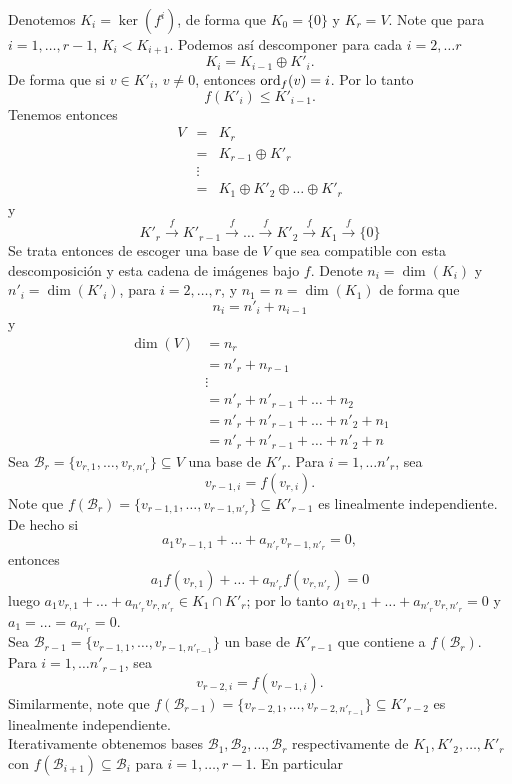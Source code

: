 \dem
Denotemos $K_i=\ker(f^i)$, de forma que $K_0=\{0\}$ y $K_r=V$. Note que para $i=1,\ldots,r-1$, $K_i<K_{i+1}$. Podemos as\'i descomponer para cada $i=2,\ldots r$
\[
K_i=K_{i-1}\oplus K'_i.
\]
De forma que si $v\in K'_i$, $v\ne 0$, entonces $\operatorname{ord}_f(v)=i$. Por lo tanto
\[
f\left(K'_i\right)\le K'_{i-1}.
\]
Tenemos entonces
\begin{eqnarray*}
V & = & K_r\\
   & = & K_{r-1}\oplus K'_r\\
   & \vdots &\\
   & = & K_1\oplus K'_2\oplus\ldots\oplus K'_r
\end{eqnarray*}
y
\[
K'_r\overset{f}\longrightarrow K'_{r-1}\overset{f}\longrightarrow\ldots\overset{f}\longrightarrow K'_2\overset{f}\longrightarrow K_1\overset{f}\longrightarrow \{0\}
\]
Se trata entonces de escoger una base de $V$ que sea compatible con esta descomposici\'on y esta cadena de im\'agenes bajo $f$. Denote $n_i=\dim(K_i)$ y $n'_i=\dim(K'_i)$, para $i=2,\ldots,r$, y $n_1=n=\dim(K_1)$ de forma que
$$n_i=n'_i+n_{i-1}$$
y
\begin{align*}
\dim(V)& =n_r\\
 & =n'_r+n_{r-1}\\
 & \vdots\\
 & =n'_r+n'_{r-1}+\ldots+n_2\\
 & =n'_r+n'_{r-1}+\ldots+n'_2+n_1\\
 & =n'_r+n'_{r-1}+\ldots+n'_2+n
\end{align*}
Sea $\mathcal{B}_r=\{v_{r,1},\ldots,v_{r,n'_r}\}\subseteq V$ una base de $K'_r$. Para $i=1,\ldots n'_r$, sea $$v_{r-1,i}=f(v_{r,i}).$$ Note que $f(\mathcal{B}_r)=\{v_{r-1,1},\ldots,v_{r-1,n'_r}\}\subseteq K'_{r-1}$ es linealmente independiente. De hecho si
\[
a_1v_{r-1,1}+\ldots+a_{n'_r}v_{r-1,n'_r}=0,
\]
entonces
\[
a_1f(v_{r,1})+\ldots+a_{n'_r}f(v_{r,n'_r})=0
\]
luego $a_1v_{r,1}+\ldots+a_{n'_r}v_{r,n'_r}\in K_1\cap K'_r$; por lo tanto $a_1v_{r,1}+\ldots+a_{n'_r}v_{r,n'_r}=0$ y $a_1=\ldots=a_{n'_r}=0$.\\
Sea $\mathcal{B}_{r-1}=\{v_{r-1,1},\ldots,v_{r-1,n'_{r-1}}\}$ un base de $K'_{r-1}$ que contiene a $f(\mathcal{B}_r)$. Para $i=1,\ldots n'_{r-1}$, sea $$v_{r-2,i}=f(v_{r-1,i}).$$ Similarmente, note que $f(\mathcal{B}_{r-1})=\{v_{r-2,1},\ldots,v_{r-2,n'_{r-1}}\}\subseteq K'_{r-2}$ es linealmente independiente.\\
Iterativamente obtenemos bases $\mathcal{B}_1,\mathcal{B}_2,\ldots,\mathcal{B}_r$ respectivamente de $K_1,K'_2,\ldots,K'_r$ con $f(\mathcal{B}_{i+1})\subseteq\mathcal{B}_i$ para $i=1,\ldots,r-1$. En particular
